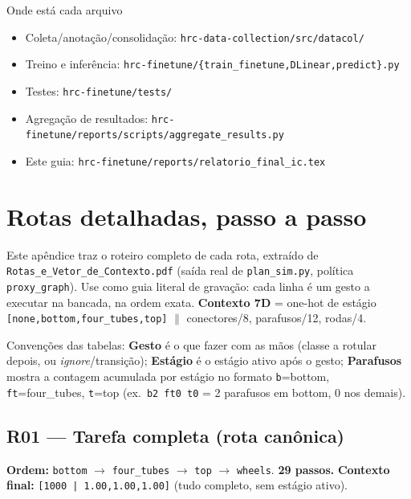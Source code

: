 \documentclass[11pt,a4paper]{article}
\begin{document}
\begin{infobox}{Onde está cada arquivo}
\begin{itemize}[leftmargin=1.5em]
\item Coleta/anotação/consolidação: \texttt{\small hrc-data-collection/src/datacol/}
\item Treino e inferência: \texttt{\small hrc-finetune/\{train\_finetune,DLinear,predict\}.py}
\item Testes: \texttt{\small hrc-finetune/tests/}
\item Agregação de resultados: \texttt{\small hrc-finetune/reports/scripts/aggregate\_results.py}
\item Este guia: \texttt{\small hrc-finetune/reports/relatorio\_final\_ic.tex}
\end{itemize}
\end{infobox}

\appendix

\section{Rotas detalhadas, passo a passo}
\label{ap:rotas}

Este apêndice traz o roteiro completo de cada rota, extraído de
\texttt{Rotas\_e\_Vetor\_de\_Contexto.pdf} (saída real de
\texttt{plan\_sim.py}, política \texttt{proxy\_graph}). Use como guia
literal de gravação: cada linha é um gesto a executar na bancada, na ordem
exata. \textbf{Contexto 7D} = one-hot de estágio
\texttt{[none,bottom,four\_tubes,top]} $\parallel$ conectores/8,
parafusos/12, rodas/4.

Convenções das tabelas: \textbf{Gesto} é o que fazer com as mãos (classe a
rotular depois, ou \textit{ignore}/transição); \textbf{Estágio} é o estágio
ativo após o gesto; \textbf{Parafusos} mostra a contagem acumulada por
estágio no formato \texttt{b}=bottom, \texttt{ft}=four\_tubes, \texttt{t}=top
(ex.\ \texttt{b2 ft0 t0} = 2 parafusos em bottom, 0 nos demais).

\subsection{R01 --- Tarefa completa (rota canônica)}
\label{ap:r01}

\textbf{Ordem:} \texttt{bottom} $\to$ \texttt{four\_tubes} $\to$
\texttt{top} $\to$ \texttt{wheels}. \textbf{29 passos.} \textbf{Contexto
final:} \texttt{[1000\,|\,1.00,1.00,1.00]} (tudo completo, sem estágio
ativo).
\end{document}
